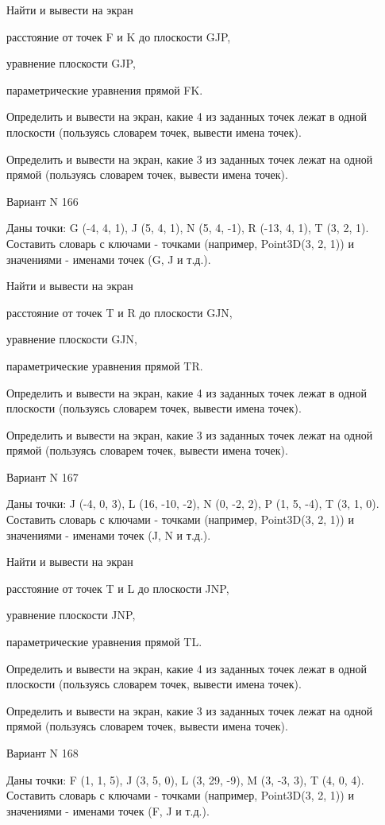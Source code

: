\documentclass[11pt]{report}
\begin{document}
Найти и вывести на экран


расстояние от точек F и K до плоскости GJP,


уравнение плоскости GJP,


параметрические уравнения прямой FK.


Определить и вывести на экран, какие 4 из заданных точек лежат в одной плоскости (пользуясь словарем точек, вывести имена точек).


Определить и вывести на экран, какие 3 из заданных точек лежат на одной прямой (пользуясь словарем точек, вывести имена точек).

\newpage
Вариант N 166

Даны точки: G (-4, 4, 1), J (5, 4, 1), N (5, 4, -1), R (-13, 4, 1), T (3, 2, 1).
Составить словарь с ключами - точками (например, Point3D(3, 2, 1)) и значениями - именами точек (G, J и т.д.).


Найти и вывести на экран


расстояние от точек T и R до плоскости GJN,


уравнение плоскости GJN,


параметрические уравнения прямой TR.


Определить и вывести на экран, какие 4 из заданных точек лежат в одной плоскости (пользуясь словарем точек, вывести имена точек).


Определить и вывести на экран, какие 3 из заданных точек лежат на одной прямой (пользуясь словарем точек, вывести имена точек).

\newpage
Вариант N 167

Даны точки: J (-4, 0, 3), L (16, -10, -2), N (0, -2, 2), P (1, 5, -4), T (3, 1, 0).
Составить словарь с ключами - точками (например, Point3D(3, 2, 1)) и значениями - именами точек (J, N и т.д.).


Найти и вывести на экран


расстояние от точек T и L до плоскости JNP,


уравнение плоскости JNP,


параметрические уравнения прямой TL.


Определить и вывести на экран, какие 4 из заданных точек лежат в одной плоскости (пользуясь словарем точек, вывести имена точек).


Определить и вывести на экран, какие 3 из заданных точек лежат на одной прямой (пользуясь словарем точек, вывести имена точек).

\newpage
Вариант N 168

Даны точки: F (1, 1, 5), J (3, 5, 0), L (3, 29, -9), M (3, -3, 3), T (4, 0, 4).
Составить словарь с ключами - точками (например, Point3D(3, 2, 1)) и значениями - именами точек (F, J и т.д.).
\end{document}
